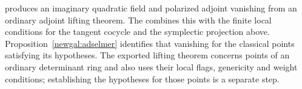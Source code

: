 produces an imaginary quadratic field and polarized adjoint vanishing
from an ordinary adjoint lifting theorem. The
combines this with the finite local conditions for the tangent cocycle
and the symplectic projection above. Proposition~\ref{newgal:adselmer}
identifies that vanishing for the classical points satisfying its
hypotheses. The exported lifting theorem concerns points of an ordinary
determinant ring and also uses their local flags, genericity and weight
conditions; establishing the hypotheses for those points is a separate
step.
